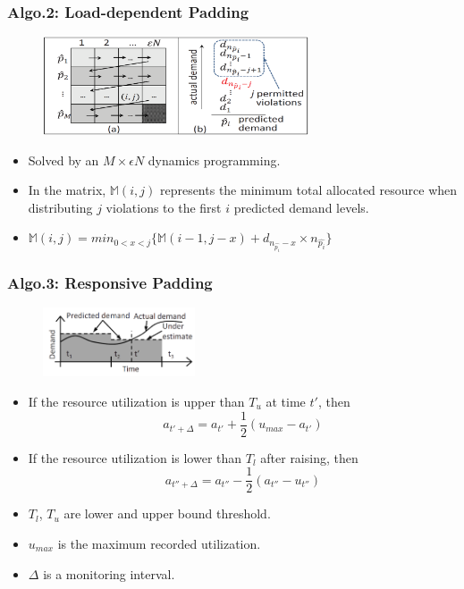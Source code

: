 \documentclass{beamer}
\begin{document}
	\begin{frame}
	\frametitle{Algo.2: Load-dependent Padding}
		\begin{figure}[h!]
		\centering
		\includegraphics[width=0.7\textwidth]{./figure/alg2_1.PNG}
		\end{figure}
		\begin{itemize}
		\item Solved by an $M\times \epsilon N$ dynamics programming.
		\item In the matrix, $\mathbb{M}(i,j)$ represents the minimum total allocated resource when distributing $j$ violations to the first $i$ predicted demand levels.
		\item $\mathbb{M}(i,j)=min_{0<x<j}\{ \mathbb{M}(i-1,j-x)+d_{n_{\hat{p_{i}}}-x}\times n_{\hat{p_{i}}} \}$
		\end{itemize}
	\end{frame}

	\begin{frame}
	\frametitle{Algo.3: Responsive Padding}
		\begin{figure}[h!]
		\centering
		\includegraphics[width=0.4\textwidth]{./figure/alg3_1.PNG}
		\end{figure}
		\begin{itemize}
		\item If the resource utilization is upper than $T_{u}$ at time $t'$, then
		\begin{equation} a_{t'+\Delta}=a_{t'}+\frac{1}{2}(u_{max}-a_{t'}) \end{equation}
		\item If the resource utilization is lower than $T_{l}$ after raising, then
		\begin{equation} a_{t''+\Delta}=a_{t''}-\frac{1}{2}(a_{t''}-u_{t''}) \end{equation}
		\item $T_{l}$, $T_{u}$ are lower and upper bound threshold.
		\item $u_{max}$ is the maximum recorded utilization.
		\item $\Delta$ is a monitoring interval.
		\end{itemize}
	\end{frame}
\end{document}
